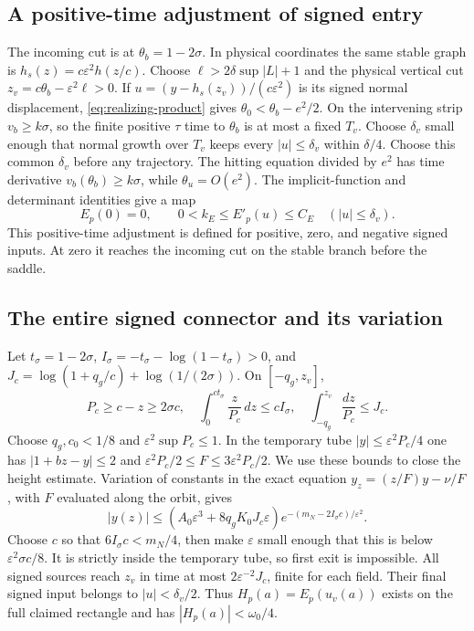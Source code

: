 \subsection{A positive-time adjustment of signed entry}
The incoming cut is at $\theta_b=1-2\sigma$.
In physical coordinates the same stable graph is
$h_s(z)=c\varepsilon^2h(z/c)$.
Choose $\ell>2\delta\sup|L|+1$ and the physical vertical cut
$z_v=c\theta_b-\varepsilon^2\ell>0$.
If $u=(y-h_s(z_v))/(c\varepsilon^2)$ is its signed normal
displacement, \eqref{eq:realizing-product} gives
$\theta_0<\theta_b-e^2/2$.
On the intervening strip $v_b\ge k\sigma$, so the finite
positive $\tau$ time to $\theta_b$ is at most a fixed $T_v$.
Choose $\delta_v$ small enough that normal growth over $T_v$
keeps every $|u|\le\delta_v$ within $\delta/4$.
Choose this common $\delta_v$ before any trajectory.
The hitting equation divided by $e^2$ has time derivative
$v_b(\theta_b)\ge k\sigma$, while $\theta_u=O(e^2)$.
The implicit-function and determinant identities give a map
\[
 E_p(0)=0,\qquad 0<k_E\le E'_p(u)\le C_E
                  \quad (|u|\le\delta_v).
\]
This positive-time adjustment is defined for positive, zero, and
negative signed inputs. At zero it reaches the incoming cut on
the stable branch before the saddle.

\subsection{The entire signed connector and its variation}
Let $t_\sigma=1-2\sigma$,
$I_\sigma=-t_\sigma-\log(1-t_\sigma)>0$, and
$J_c=\log(1+q_g/c)+\log(1/(2\sigma))$.
On $[-q_g,z_v]$,
\[
 P_c\ge c-z\ge2\sigma c,\quad
 \int_0^{ct_\sigma}\frac z{P_c}\,dz\le cI_\sigma,\quad
 \int_{-q_g}^{z_v}\frac {dz}{P_c}\le J_c .
\]
Choose $q_g,c_0<1/8$ and
$\varepsilon^2\sup P_c\le1$.
In the temporary tube $|y|\le\varepsilon^2P_c/4$ one has
$|1+bz-y|\le2$ and
$\varepsilon^2P_c/2\le F\le3\varepsilon^2P_c/2$.
We use these bounds to close the height estimate.
Variation of constants in the exact equation
$y_z=(z/F)y-\nu/F$, with $F$ evaluated along the orbit, gives
\begin{equation}\label{eq:realizing-connector-height}
 |y(z)|\le
 (A_0\varepsilon^3+8q_gK_0J_c\varepsilon)
           e^{-(m_N-2I_\sigma c)/\varepsilon^2}.
\end{equation}
Choose $c$ so that $6I_\sigma c<m_N/4$, then make
$\varepsilon$ small enough that this is below
$\varepsilon^2\sigma c/8$. It is strictly inside the temporary
tube, so first exit is impossible. All signed sources reach
$z_v$ in time at most $2\varepsilon^{-2}J_c$, finite for each
field. Their final signed input belongs to $|u|<\delta_v/2$.
Thus $H_p(a)=E_p(u_v(a))$ exists on the full claimed rectangle
and has $|H_p(a)|<\omega_0/4$.

